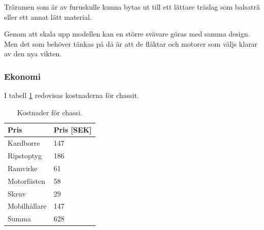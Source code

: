 Träramen som är av furuskulle kunna bytas ut till ett lättare träslag som
balsaträ eller ett annat lätt material.

Genom att skala upp modellen kan en större svävare göras med samma design. Men
det som behöver tänkas på då är att de fläktar och motorer som väljs klarar av
den nya vikten.

\subsubsection{Ekonomi}
I tabell \ref{tbl:Kostnad chassi} redovisas kostnaderna för chassit.
\begin{table}[htbp!]
\centering
\caption{Kostnader för chassi.}
\label{tbl:Kostnad chassi}
\begin{tabular}{l|l}
\hline
Pris & Pris [SEK] \\
\hline
Kardborre & 147 \\
Ripstoptyg & 186 \\
Ramvirke & 61 \\
Motorfästen & 58 \\
Skruv & 29 \\
Mobilhållare & 147 \\
\hline
Summa & 628

\end{tabular}
\end{table}

